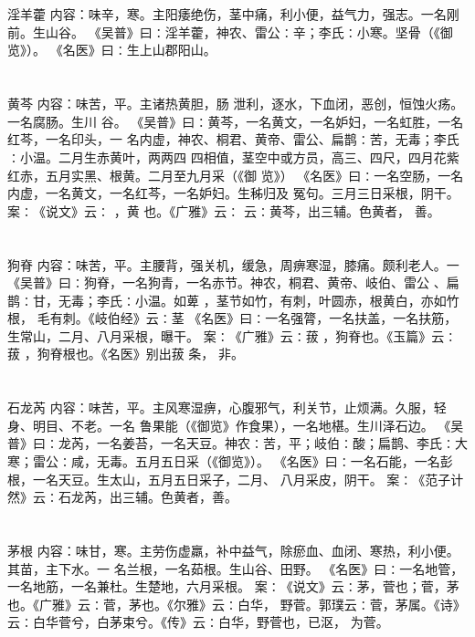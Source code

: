 \documentclass[12pt,UTF8]{ctexbook}
\begin{document}
\section{}淫羊藿
内容：味辛，寒。主阳痿绝伤，茎中痛，利小便，益气力，强志。一名刚前。生山谷。 
《吴普》曰∶淫羊藿，神农、雷公∶辛；李氏∶小寒。坚骨（《御览》）。 
《名医》曰∶生上山郡阳山。 


\section{}黄芩
内容：味苦，平。主诸热黄胆，肠 泄利，逐水，下血闭，恶创，恒蚀火疡。一名腐肠。生川 
谷。 
《吴普》曰∶黄芩，一名黄文，一名妒妇，一名虹胜，一名红芩，一名印头，一 
名内虚，神农、桐君、黄帝、雷公、扁鹊∶苦，无毒；李氏∶小温。二月生赤黄叶，两两四 
四相值，茎空中或方员，高三、四尺，四月花紫红赤，五月实黑、根黄。二月至九月采（《御 
览》） 
《名医》曰∶一名空肠，一名内虚，一名黄文，一名红芩，一名妒妇。生秭归及 
冤句。三月三日采根，阴干。 
案∶《说文》云∶ ，黄 也。《广雅》云∶ 
云∶黄芩，出三辅。色黄者， 
善。 


\section{}狗脊
内容：味苦，平。主腰背，强关机，缓急，周痹寒湿，膝痛。颇利老人。一 
《吴普》曰∶狗脊，一名狗青，一名赤节。神农，桐君、黄帝、岐伯、雷公 
、扁鹊∶甘，无毒；李氏∶小温。如萆 ，茎节如竹，有刺，叶圆赤，根黄白，亦如竹根， 
毛有刺。《岐伯经》云∶茎 
《名医》曰∶一名强膂，一名扶盖，一名扶筋，生常山，二月、八月采根，曝干。 
案∶《广雅》云∶菝 ，狗脊也。《玉篇》云∶菝 ，狗脊根也。《名医》别出菝 条， 
非。 


\section{}石龙芮
内容：味苦，平。主风寒湿痹，心腹邪气，利关节，止烦满。久服，轻身、明目、不老。一名 
鲁果能（《御览》作食果），一名地椹。生川泽石边。 
《吴普》曰∶龙芮，一名姜苔，一名天豆。神农∶苦，平；岐伯∶酸；扁鹊、李氏∶大 
寒；雷公∶咸，无毒。五月五日采（《御览》）。 
《名医》曰∶一名石能，一名彭根，一名天豆。生太山，五月五日采子，二月、 
八月采皮，阴干。 
案∶《范子计然》云∶石龙芮，出三辅。色黄者，善。 


\section{}茅根
内容：味甘，寒。主劳伤虚羸，补中益气，除瘀血、血闭、寒热，利小便。其苗，主下水。一 
名兰根，一名茹根。生山谷、田野。 
《名医》曰∶一名地管，一名地筋，一名兼杜。生楚地，六月采根。 
案∶《说文》云∶茅，菅也；菅，茅也。《广雅》云∶菅，茅也。《尔雅》云∶白华， 
野菅。郭璞云∶菅，茅属。《诗》云∶白华菅兮，白茅束兮。《传》云∶白华，野菅也，已沤， 
为菅。 
\end{document}

